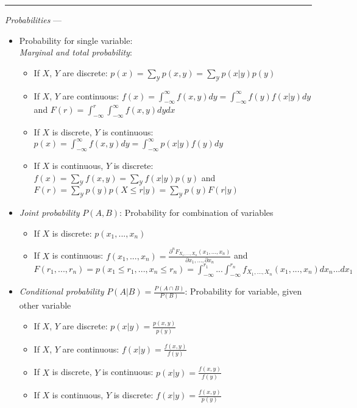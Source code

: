 {\color{lightgray}\hrule height 0.001mm}

\emph{Probabilities} --- 
\begin{itemize}
    \item Probability for single variable:\\
    \emph{Marginal and total probability}:
    \begin{itemize}
        \item If $X$, $Y$ are discrete: $p(x) = \sum_{\mathcal{Y}}p(x,y) = \sum_{\mathcal{Y}} p(x|y)p(y)$
        \item If $X$, $Y$ are continuous: $f(x) =\int_{-\infty}^{\infty} f(x,y)dy = \int_{-\infty}^{\infty} f(y)f(x|y)dy$ and $F(r) = \int_{-\infty}^r \int_{-\infty}^{\infty} f(x,y)dy dx$
        \item If $X$ is discrete, $Y$ is continuous: $p(x) = \int_{-\infty}^{\infty} f(x,y)dy = \int_{-\infty}^{\infty} p(x|y) f(y) dy$
        \item If $X$ is continuous, $Y$ is discrete: $f(x) = \sum_{\mathcal{Y}} f(x,y) = \sum_{\mathcal{Y}} f(x|y) p(y)$ and $ F(r) = \sum_{\mathcal{Y}} p(y) p(X \leq r | y) = \sum_{\mathcal{Y}} p(y) F(r|y)$
    \end{itemize} 
    \item \emph{Joint probability} $P(A, B)$: Probability for combination of variables 
    \begin{itemize}
        \item If $X$ is discrete: $p(x_1,...,x_n)$
        \item If $X$ is continuous: $f(x_1, ...,x_n) = \frac{\partial^n F_{X_1, ..., X_n}(x_1, ..., x_n)}{\partial x_1, ..., \partial x_n}$ and $F(r_1, ..., r_n) = p(x_1 \leq r_1,...,x_n \leq r_n) = \int_{-\infty}^{r_1} ...  \int_{-\infty}^{r_n} f_{X_1, ..., X_n}(x_1, ..., x_n) dx_n ... dx_1$
    \end{itemize}
    \item \emph{Conditional probability} $P(A|B) = \frac{P(A \cap B)}{P(B)}$: Probability for variable, given other variable
    \begin{itemize}
        \item If $X$, $Y$ are discrete: $p(x|y) = \frac{p(x,y)}{p(y)}$
        \item If $X$, $Y$ are continuous: $f(x|y) = \frac{f(x,y)}{f(y)}$
        \item If $X$ is discrete, $Y$ is continuous: $p(x|y) = \frac{f(x,y)}{f(y)}$
        \item If $X$ is continuous, $Y$ is discrete: $f(x|y) = \frac{f(x,y)}{p(y)}$

\end{itemize}
\end{itemize}
